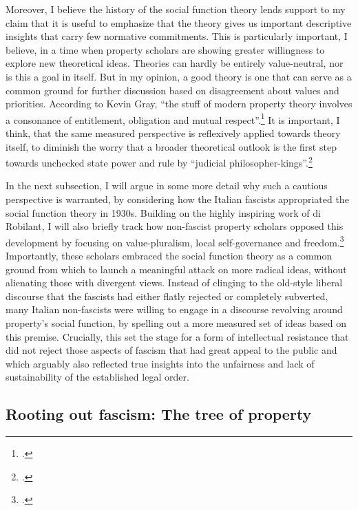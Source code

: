 Moreover, I believe the history of the social function theory lends support to my claim that it is useful to emphasize that the theory gives us important descriptive insights that carry few normative commitments. This is particularly important, I believe, in a time when property scholars are showing greater willingness to explore new theoretical ideas. Theories can hardly be entirely value-neutral, nor is this a goal in itself. But in my opinion, a good theory is one that can serve as a common ground for further discussion based on disagreement about values and priorities. According to Kevin Gray, ``the stuff of modern property theory involves a consonance of entitlement, obligation and mutual respect''.\footcite[37]{gray11} It is important, I think, that the same measured perspective is reflexively applied towards theory itself, to diminish the worry that a broader theoretical outlook is the first step towards unchecked state power and rule by ``judicial philosopher-kings''.\footcite[944]{claeys09}

In the next subsection, I will argue in some more detail why such a cautious perspective is warranted, by considering how the Italian fascists appropriated the social function theory in 1930s. Building on the highly inspiring work of di Robilant, I will also briefly track how non-fascist property scholars opposed this development by focusing on value-pluralism, local self-governance and freedom.\footcite{robilant13} Importantly, these scholars embraced the social function theory as a common ground from which to launch a meaningful attack on more radical ideas, without alienating those with divergent views. Instead of clinging to the old-style liberal discourse that the fascists had either flatly rejected or completely subverted, many Italian non-fascists were willing to engage in a discourse revolving around property's social function, by spelling out a more measured set of ideas based on this premise. Crucially, this set the stage for a form of intellectual resistance that did not reject those aspects of fascism that had great appeal to the public and which arguably also reflected true insights into the unfairness and lack of sustainability of the established legal order.

\subsection{Rooting out fascism: {T}he tree of property}

